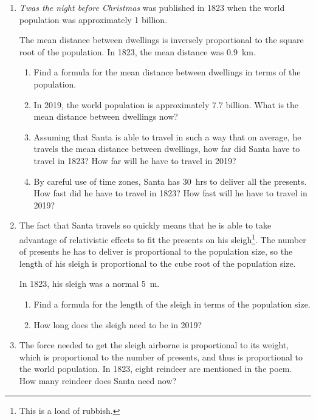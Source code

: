 \documentclass{article}
\begin{document}
\begin{enumerate}
\item \emph{Twas the night before Christmas} was published in 1823 when the world population was approximately \num{1} billion.

The mean distance between dwellings is inversely proportional to the square root of the population.
In 1823, the mean distance was \SI{0.9}{km}.

\begin{enumerate}
\item Find a formula for the mean distance between dwellings in terms of the population.

\item In 2019, the world population is approximately \num{7.7} billion.
What is the mean distance between dwellings now?

\item Assuming that Santa is able to travel in such a way that on average, he travels the mean distance between dwellings, how far did Santa have to travel in 1823?
How far will he have to travel in 2019?

\item By careful use of time zones, Santa has \SI{30}{hrs} to deliver all the presents.
How fast did he have to travel in 1823?
How fast will he have to travel in 2019?
\end{enumerate}

\item The fact that Santa travels so quickly means that he is able to take advantage of relativistic effects to fit the presents on his sleigh\footnote{This is a load of rubbish.}.
The number of presents he has to deliver is proportional to the population size, so the length of his sleigh is proportional to the cube root of the population size.

In 1823, his sleigh was a normal \SI{5}{m}.

\begin{enumerate}
\item Find a formula for the length of the sleigh in terms of the population size.

\item How long does the sleigh need to be in 2019?
\end{enumerate}

\item The force needed to get the sleigh airborne is proportional to its weight, which is proportional to the number of presents, and thus is proportional to the world population.
In 1823, eight reindeer are mentioned in the poem.
How many reindeer does Santa need now?


\end{enumerate}
\end{document}
